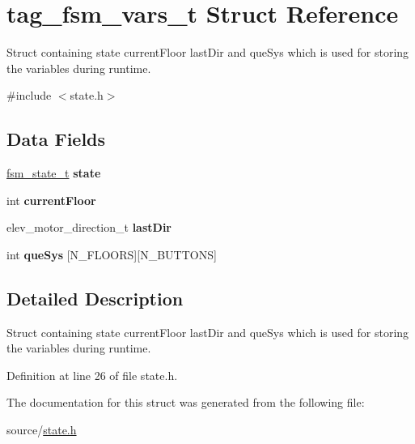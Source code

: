 \hypertarget{structtag__fsm__vars__t}{}\section{tag\+\_\+fsm\+\_\+vars\+\_\+t Struct Reference}
\label{structtag__fsm__vars__t}


Struct containing {\ttfamily state} {\ttfamily current\+Floor} {\ttfamily last\+Dir} and {\ttfamily que\+Sys} which is used for storing the variables during runtime.  




{\ttfamily \#include $<$state.\+h$>$}

\subsection*{Data Fields}
\begin{DoxyCompactItemize}
\item 
\mbox{\label{structtag__fsm__vars__t_a1ee9cb632b734d8e3ff4676060784846}} 
\mbox{\hyperlink{state_8h_a895a95c837e23afd3f65d85733fd09bc}{fsm\+\_\+state\+\_\+t}} {\bfseries state}
\item 
\mbox{\label{structtag__fsm__vars__t_abca1a9906680fdae8e9e8534cdaf7c92}} 
int {\bfseries current\+Floor}
\item 
\mbox{\label{structtag__fsm__vars__t_ace7a5a656eab5d5ddc187666f1c8d86d}} 
elev\+\_\+motor\+\_\+direction\+\_\+t {\bfseries last\+Dir}
\item 
\mbox{\label{structtag__fsm__vars__t_a5f0d48bc34875f3248c195da941947be}} 
int {\bfseries que\+Sys} \mbox{[}N\+\_\+\+F\+L\+O\+O\+RS\mbox{]}\mbox{[}N\+\_\+\+B\+U\+T\+T\+O\+NS\mbox{]}
\end{DoxyCompactItemize}


\subsection{Detailed Description}
Struct containing {\ttfamily state} {\ttfamily current\+Floor} {\ttfamily last\+Dir} and {\ttfamily que\+Sys} which is used for storing the variables during runtime. 

Definition at line 26 of file state.\+h.



The documentation for this struct was generated from the following file\+:\begin{DoxyCompactItemize}
\item 
source/\mbox{\hyperlink{state_8h}{state.\+h}}\end{DoxyCompactItemize}
